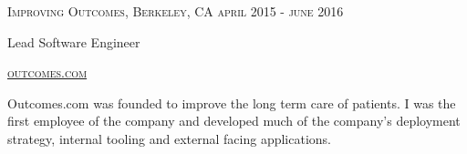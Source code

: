 {
  \textsc{\small{Improving Outcomes, Berkeley, CA
    \hfill
      {\raggedleft
        april 2015 - june 2016
      } \\
    }
  }
  {\raggedright\large {
      Lead Software Engineer
  }}

  \textsc{\small\href{http://www.outcomes.com}{outcomes.com}}

  \normalsize{\raggedright
    Outcomes.com was founded to improve the long term care of patients. 
    I was the first employee of the company and 
    developed much of the company's deployment strategy, internal tooling and 
    external facing applications. 
  }
}
